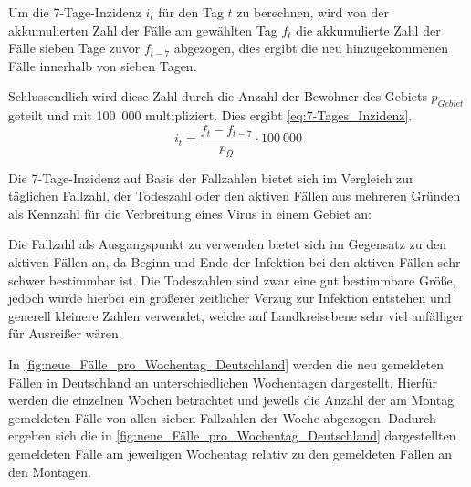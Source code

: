 Um die 7-Tage-Inzidenz $i_t$ für den Tag $t$ zu berechnen, wird von der akkumulierten Zahl der Fälle  am gewählten Tag $f_t$ die akkumulierte Zahl der Fälle sieben Tage zuvor $f_{t-7}$ abgezogen, dies ergibt die neu hinzugekommenen Fälle innerhalb von sieben Tagen.

Schlussendlich wird diese Zahl durch die Anzahl der Bewohner des Gebiets $p_{Gebiet}$ geteilt und mit 100~000 multipliziert. Dies ergibt \autoref{eq:7-Tages_Inzidenz}.
\begin{equation}\label{eq:7-Tages_Inzidenz}
    i_t= \frac{f_t-f_{t-7}}{p_{\Omega}}\cdot 100~000
\end{equation}

Die 7-Tage-Inzidenz auf Basis der Fallzahlen bietet sich im Vergleich zur täglichen Fallzahl, der Todeszahl oder den aktiven Fällen aus mehreren Gründen als Kennzahl für die Verbreitung eines Virus in einem Gebiet an:

Die Fallzahl als Ausgangspunkt zu verwenden bietet sich im Gegensatz zu den aktiven Fällen an, da Beginn und Ende der Infektion bei den aktiven Fällen sehr schwer bestimmbar ist. Die Todeszahlen sind zwar eine gut bestimmbare Größe, jedoch würde hierbei ein größerer zeitlicher Verzug zur Infektion entstehen und generell kleinere Zahlen verwendet, welche auf Landkreisebene sehr viel anfälliger für Ausreißer wären.

In \autoref{fig:neue_Fälle_pro_Wochentag_Deutschland} werden die neu gemeldeten Fällen in Deutschland an unterschiedlichen Wochentagen dargestellt. Hierfür werden die einzelnen Wochen betrachtet und jeweils die Anzahl der am Montag gemeldeten Fälle von allen sieben Fallzahlen der Woche abgezogen. Dadurch ergeben sich die in \autoref{fig:neue_Fälle_pro_Wochentag_Deutschland} dargestellten gemeldeten Fälle am jeweiligen Wochentag relativ zu den gemeldeten Fällen an den Montagen.

